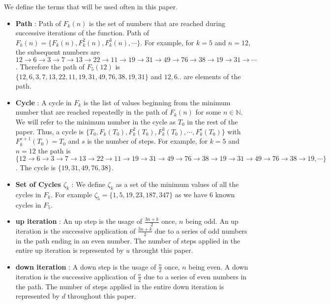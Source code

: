 \documentclass[12pt]{article} %
\begin{document}
We define the terms that will be used often in this paper. 
\begin{itemize}
    \item \textbf{Path} : Path of $F_k(n)$ is the set of numbers that are reached during successive iterations of the function. Path of $F_k(n) = \{F_k(n), F_k^2(n), F_k^3(n), \cdots \}$. For example, for $k=5$ and $n=12$, the subsequent numbers are $12 \rightarrow  6 \rightarrow  3\rightarrow 7 \rightarrow  13\rightarrow 22 \rightarrow  11\rightarrow 19\rightarrow 31\rightarrow  49\rightarrow 76 \rightarrow 38\rightarrow 19 \rightarrow  31\rightarrow \cdots$. Therefore the path of $F_5(12)$ is $\{12, 6, 3, 7, 13, 22, 11, 19, 31, 49, 76, 38, 19, 31\}$ and $12, 6 ..$ are elements of the path.
    
    \item \textbf{Cycle} : A cycle in $F_k$ is the list of values beginning from the minimum number that are reached repeatedly in the path of $F_k(n)$ for some $n \in \mathbb{N}$. We will refer to the minimum number in the cycle as $T_0$ in the rest of the paper. Thus, a cycle is $\{T_0, F_k(T_0), F^2_k(T_0), F^3_k(T_0), \cdots , F^s_k(T_0)\}$ with $F^{s+1}_k(T_0) = T_0$ and $s$ is the number of steps. For example, for $k=5$ and $n=12$ the path is $\{12 \rightarrow  6 \rightarrow  3\rightarrow 7 \rightarrow  13\rightarrow 22 \rightarrow  11\rightarrow 19\rightarrow 31\rightarrow  49\rightarrow 76 \rightarrow  38\rightarrow 19 \rightarrow  31\rightarrow 49 \rightarrow 76\rightarrow 38\rightarrow 19, \cdots\}$.  The cycle is $\{19, 31, 49, 76, 38\}$.
      
      \item \textbf{Set of Cycles $\zeta_k$} : We define $\zeta_k$ as a set of the minimum values of all the cycles in $F_k$. For example $\zeta_5 = \{ 1, 5, 19, 23, 187, 347\}$ as we have $6$ known cycles in $F_5$.
      
      \item \textbf{up iteration} : An up step is the usage of $\frac{3n+k}{2}$ once, $n$ being odd. An up iteration is the successive application of $\frac{3n+k}{2}$ due to a series of odd numbers in the path ending in an even number. The number of steps applied in the entire up iteration is represented by $u$ throught this paper.
      
      \item \textbf{down iteration} : A down step is the usage of $\frac{n}{2}$ once, $n$ being even. A down iteration is the successive application of $\frac{n}{2}$ due to a series of even numbers in the path. The number of steps applied in the entire down iteration is represented by $d$ throughout this paper.
      

\end{itemize}
\end{document}
